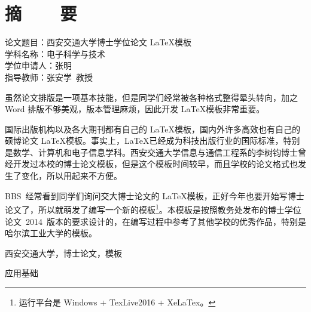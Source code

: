 
\titlespacing{\chapter}{0pt}{23mm}{6mm}
\chapter*{摘~~~~要}
\setcounter{page}{1}

\vskip-50mm
{\xiaosi\hei 
	\noindent 论文题目：西安交通大学博士学位论文 \LaTeX 模板 \\
	\noindent 学科名称：电子科学与技术 \\
	\noindent 学位申请人：张明 \\
	\noindent 指导教师：张安学~教授
}
\vskip22mm

虽然论文排版是一项基本技能，但是同学们经常被各种格式整得晕头转向，加之 Word 排版不够美观，版本管理麻烦，因此开发 \LaTeX 模板非常重要。

国际出版机构以及各大期刊都有自己的 \LaTeX 模板，国内外许多高效也有自己的硕博论文 \LaTeX 模板。事实上，\LaTeX 已经成为科技出版行业的国际标准，特别是数学、计算机和电子信息学科。西安交通大学信息与通信工程系的李树钧博士曾经开发过本校的博士论文模板，但是这个模板时间较早，而且学校的论文格式也发生了变化，所以用起来不方便。

BBS~经常看到同学们询问交大博士论文的 \LaTeX 模板，正好今年也要开始写博士论文了，所以就萌发了编写一个新的模板\footnote{运行平台是 \color{red}Windows + TexLive2016 + XeLaTex。}。本模板是按照教务处发布的博士学位论文~2014~版本的要求设计的，在编写过程中参考了其他学校的优秀作品，特别是哈尔滨工业大学的模板。

\vspace{\baselineskip}
 西安交通大学，博士论文，模板

\vspace{\baselineskip}
 应用基础
\clearpage

\titlespacing{\chapter}{0pt}{20.5mm}{5mm}
